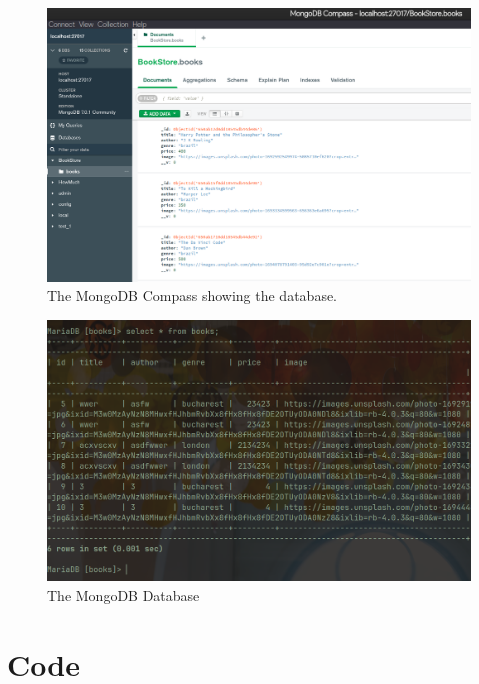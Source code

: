 \documentclass[11pt]{article}
\begin{document}
\begin{figure}[H]
    \centering
    \includegraphics[width=.85\textwidth]{Screenshots/mongo.png}
    \caption{The MongoDB Compass showing the database. }
\end{figure}
\begin{figure}[H]
    \centering
    \includegraphics[width=.85\textwidth]{Screenshots/mongo 2.png}
    \caption{The MongoDB Database}
\end{figure}

\section{Code}





\end{document}
